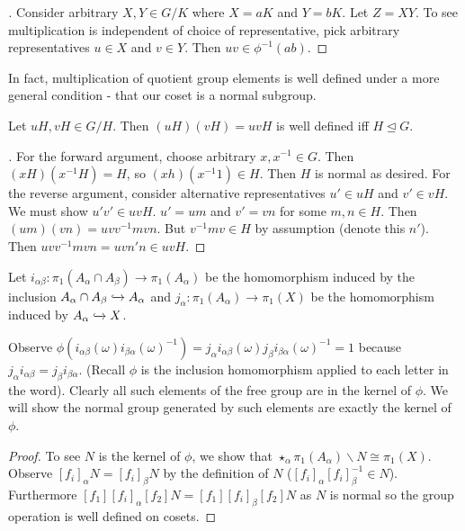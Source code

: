 \documentclass[10pt]{article}
\begin{document}
\begin{proof}[]
	Consider arbitrary $X, Y \in G / K$ where $X = aK$ and $Y = bK$. Let $Z = XY$. To see multiplication is independent of choice of representative, pick arbitrary representatives $u \in X$ and $v \in Y$. Then $uv \in \phi^{-1}(ab)$.
\end{proof}

In fact, multiplication of quotient group elements is well defined under a more general condition - that our coset is a normal subgroup.

\begin{proposition}[]
	Let $uH, vH \in G / H$. Then $(uH)(vH) = uvH$ is well defined iff $H \trianglelefteq G$.
\end{proposition}

\begin{proof}[]
	For the forward argument, choose arbitrary $x, x^{-1} \in G$. Then $(xH)(x^{-1}H) = H$, so $(xh)(x^{-1}1) \in H$. Then $H$ is normal as desired.
	For the reverse argument, consider alternative representatives $u' \in uH$ and $v' \in vH$. We must show $u'v' \in uvH$. $u' = um$ and $v' = vn$ for some $m, n \in H$. Then $(um)(vn) = uvv^{-1}mvn$. But $v^{-1}mv \in H$ by assumption (denote this $n'$). Then $uvv^{-1}mvn = uvn'n \in uvH$.
\end{proof}

\begin{theorem}

	Let $i_{\alpha\beta}: \pi_1(A_{\alpha} \cap A_{\beta}) \to \pi_1(A_{\alpha})$ be the homomorphism induced by the inclusion $A_{\alpha} \cap A_{\beta} \xhookrightarrow{} A_{\alpha}$ and $j_{\alpha}: \pi_1(A_{\alpha}) \to \pi_1(X)$ be the homomorphism induced by $A_{\alpha} \xhookrightarrow{} X$.

	Observe $\phi(i_{\alpha\beta}(\omega)i_{\beta\alpha}(\omega)^{-1}) = j_{\alpha}i_{\alpha\beta}(\omega)j_{\beta}i_{\beta\alpha}(\omega)^{-1} = 1$ because $j_{\alpha}i_{\alpha\beta} = j_{\beta}i_{\beta\alpha}$. (Recall $\phi$ is the inclusion homomorphism applied to each letter in the word). Clearly all such elements of the free group are in the kernel of $\phi$. We will show the normal group generated by such elements are exactly the kernel of $\phi$.

\end{theorem}

\begin{proof}

	To see $N$ is the kernel of $\phi$, we show that $\star_{\alpha} \pi_1(A_{\alpha}) \backslash N \cong \pi_1(X)$.
	Observe $[f_i]_{\alpha}N = [f_i]_{\beta}N$ by the definition of $N$ ($[f_i]_{\alpha}[f_i]_{\beta}^{-1} \in N$). Furthermore $[f_1][f_i]_{\alpha}[f_2]N = [f_1][f_i]_{\beta}[f_2]N$ as $N$ is normal so the group operation is well defined on cosets.

\end{proof}
\end{document}
